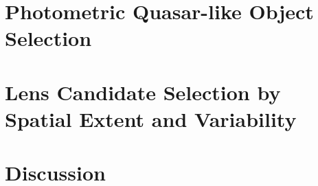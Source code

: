 \documentclass[useAMS,usenatbib]{mn2e}
\begin{document}




\section{Photometric Quasar-like Object Selection}
\label{sec:uvx}




\section{Lens Candidate Selection by Spatial Extent and Variability}
\label{sec:uvx}





\section{Discussion}
\label{sec:discuss}


\end{document}
